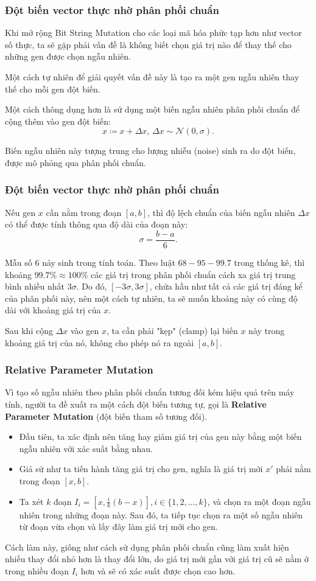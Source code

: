 \begin{frame}[fragile]
\frametitle{Đột biến vector thực nhờ phân phối chuẩn}
Khi mở rộng Bit String Mutation cho các loại mã hóa phức tạp hơn như vector số
thực, ta sẽ gặp phải vấn đề là không biết chọn giá trị nào để thay thế cho những
gen được chọn ngẫu nhiên.

Một cách tự nhiên để giải quyết vấn đề này là tạo ra một gen ngẫu nhiên thay thế
cho mỗi gen đột biến.

Một cách thông dụng hơn là sử dụng một biến ngẫu nhiên phân phối chuẩn để cộng
thêm vào gen đột biến:
\[
  x \coloneqq  x + \Delta x,\, \Delta x \sim \mathcal{N}(0, \sigma)
.\] 

Biến ngẫu nhiên này tượng trung cho lượng nhiễu (noise) sinh ra do đột biến,
được mô phỏng qua phân phối chuẩn.
\end{frame}

\begin{frame}[fragile]
\frametitle{Đột biến vector thực nhờ phân phối chuẩn}
Nếu gen \( x \) cần nằm trong đoạn \( [a, b] \), thì độ lệch chuẩn của biến ngẫu
nhiên \( \Delta x \) có thể được tính thông qua độ dài của đoạn này:
\[
  \sigma = \frac{b - a}{6}
.\] 

Mẫu số \( 6 \) nảy sinh trong tính toán. Theo luật \( 68-95-99.7 \) trong thống
kê, thì khoảng \( 99.7\% \approx 100\% \) các giá trị trong phân phối chuẩn
cách xa giá trị trung bình nhiều nhất \( 3\sigma \). Do đó, \( [- 3\sigma, 
3\sigma] \), chứa hầu như tất cả các giá trị đáng kể của phân phối này, nên một
cách tự nhiên, ta sẽ muốn khoảng này có cùng độ dài với khoảng giá trị của \( x
\).

Sau khi cộng \( \Delta x \) vào gen \( x \), ta cần phải "kẹp" (clamp) lại biến
\( x \) này trong khoảng giá trị của nó, không cho phép nó ra ngoài \( [a, b]
\).
\end{frame}

\begin{frame}[fragile]
\frametitle{Relative Parameter Mutation}
Vì tạo số ngẫu nhiên theo phân phối chuẩn tương đối kém hiệu quả trên máy tính,
người ta đề xuất ra một cách đột biến tương tự, gọi là \textbf{Relative
Parameter Mutation} (đột biến tham số tương đối).
\begin{itemize}
\item Đầu tiên, ta xác định nên tăng hay giảm giá trị của gen này bằng một biến
  ngẫu nhiên với xác suất bằng nhau.
\item Giả sử như ta tiến hành tăng giá trị cho gen, nghĩa là giá trị mới \( x'
  \) phải nằm trong đoạn \( [x, b] \).
\item Ta xét \( k \) đoạn \( I_{i} = \left[ x, \frac{i}{k}(b - x) \right], i \in
  \{1, 2, \ldots ,k\}  \), và chọn ra một đoạn ngẫu nhiên trong những đoạn này.
  Sau đó, ta tiếp tục chọn ra một số ngẫu nhiên từ đoạn vừa chọn và lấy đây làm
  giá trị mới cho gen.
\end{itemize}

  Cách làm này, giống như cách sử dụng phân phối chuẩn cũng làm xuất hiện
  nhiều thay đổi nhỏ hơn là thay đổi lớn, do giá trị mới gần với giá trị cũ sẽ
  nằm ở trong nhiều đoạn \( I_{i} \) hơn và sẽ có xác suất được chọn cao hơn.
\end{frame}

